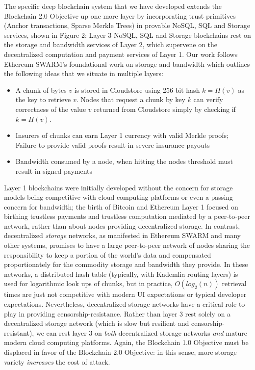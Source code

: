 \documentclass{article}
\newcommand{\hash}[1]{H(#1)}
\begin{document}
The specific deep blockchain system that we have developed extends the Blockchain 2.0 Objective up one more layer by incorporating trust primitives (Anchor transactions, Sparse Merkle Trees) in provable NoSQL, SQL and Storage services, shown in Figure 2:  Layer 3 NoSQL, SQL and Storage blockchains rest on the storage and bandwidth services of Layer 2, which supervene on the decentralized computation and payment services of Layer 1.  Our work follows Ethereum SWARM's foundational work on storage and bandwidth \cite{swarm} which outlines the following ideas that we situate in multiple layers:
\begin{itemize}
    \item A chunk of bytes $v$ is stored in Cloudstore using 256-bit hash $k = \hash{v}$ as the key to retrieve $v$.  Nodes that request a chunk by key $k$ can verify correctness of the value $v$ returned from Cloudstore simply by checking if   $k=\hash{v}$. 
    \item Insurers of chunks can earn Layer 1 currency with valid Merkle proofs; Failure to provide valid proofs result in severe insurance payouts
    \item Bandwidth consumed by a node, when hitting the nodes threshold must result in signed payments 
\end{itemize}
Layer 1 blockchains were initially developed without the concern for storage models being competitive with cloud computing platforms or even a passing concern for bandwidth; the birth of Bitcoin and Ethereum Layer 1 focused on birthing trustless payments and trustless computation mediated by a peer-to-peer network, rather than about nodes providing decentralized storage.   In contrast, decentralized {\em storage} networks, as manifested in Ethereum SWARM and many other systems, promises to have a large peer-to-peer network of nodes sharing the responsibility to keep a portion of the world's data and compensated proportionately for the commodity storage and bandwidth they provide.  In these networks, a distributed hash table (typically, with Kademlia routing layers) is used for logarithmic look ups of chunks, but in practice, $O(log_2(n))$ retrieval times are just not competitive with modern UI expectations or typical developer expectations.  Nevertheless, decentralized storage networks have a critical role to play in providing censorship-resistance.  Rather than layer 3 rest solely on a decentralized storage network (which is slow but resilient and censorship-resistant), we can rest layer 3 on {\em both} decentralized storage networks {\em and} mature modern cloud computing platforms.  Again, the Blockchain 1.0 Objective must be displaced in favor of the Blockchain 2.0 Objective: in this sense, more storage variety {\em increases} the cost of attack.  
\end{document}
